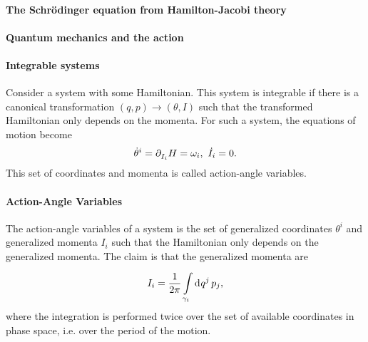 \paragraph{The Schrödinger equation from Hamilton-Jacobi theory}

\paragraph{Quantum mechanics and the action}

\paragraph{Integrable systems}
Consider a system with some Hamiltonian. This system is integrable if there is a canonical transformation $(q, p)\to (\theta, I)$ such that the transformed Hamiltonian only depends on the momenta. For such a system, the equations of motion become
\begin{align*}
	\dot{\theta}^{i} = \partial^{}_{I_{i}}H = \omega_{i},\ \dot{I}_{i} = 0.
\end{align*}
This set of coordinates and momenta is called action-angle variables.

\paragraph{Action-Angle Variables}
The action-angle variables of a system is the set of generalized coordinates $\theta^{i}$ and generalized momenta $I_{i}$ such that the Hamiltonian only depends on the generalized momenta. The claim is that the generalized momenta are
\begin{align*}
	I_{i} = \frac{1}{2\pi}\int\limits_{\gamma_{i}}^{}\dd[]{q^{j}}p_{j},
\end{align*}
where the integration is performed twice over the set of available coordinates in phase space, i.e. over the period of the motion.

